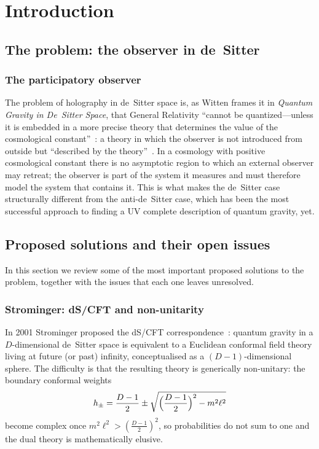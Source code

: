 \section{Introduction}\label{sec:intro}

\subsection{The problem: the observer in de~Sitter}\label{sec:problem}

\subsubsection{The participatory observer}\label{sssec:participatory}
The problem of holography in de~Sitter space is, as Witten frames it in \emph{Quantum Gravity in De~Sitter Space}, that General Relativity ``cannot be quantized---unless it is embedded in a more precise theory that determines the value of the cosmological constant''~\cite{Witten01dS}: a theory in which the observer is not introduced from outside but ``described by the theory''~\cite{CLPW22}.
In a cosmology with positive cosmological constant there is no asymptotic region to which an external observer may
retreat; the observer is part of the system it measures and must therefore model the system that contains it. This
is what makes the de~Sitter case structurally different from the anti-de~Sitter case, which has been the most
successful approach to finding a UV complete description of quantum gravity, yet.

\subsection{Proposed solutions and their open issues}\label{sec:proposals}
In this section we review some of the most important proposed solutions to the problem, together with the issues
that each one leaves unresolved.

\subsubsection{Strominger: dS/CFT and non-unitarity}
In 2001 Strominger proposed the dS/CFT correspondence~\cite{Strominger01}: quantum gravity in a $D$-dimensional
de~Sitter space is equivalent to a Euclidean conformal field theory living at future (or past) infinity,
conceptualised as a $(D{-}1)$-dimensional sphere. The difficulty is that the resulting theory is generically
non-unitary: the boundary conformal weights
\begin{equation}
h_{\pm}=\frac{D-1}{2}\pm\sqrt{\Bigl(\frac{D-1}{2}\Bigr)^{2}-m^{2}\ell^{2}}
\end{equation}
become complex once $m^{2}\ell^{2}>(\tfrac{D-1}{2})^{2}$, so probabilities do not sum to one and the dual theory is
mathematically elusive.

